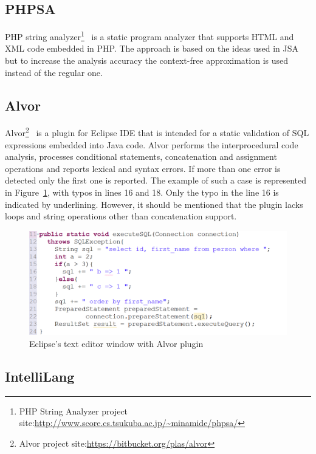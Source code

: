 \subsection{PHPSA}
PHP string analyzer\footnote{PHP String Analyzer project site:\url{http://www.score.cs.tsukuba.ac.jp/~minamide/phpsa/}}~\cite{PHPSA:ref} is a static program analyzer that supports HTML and XML code embedded in PHP. The approach is based on the ideas used in JSA but to increase the analysis accuracy the context-free approximation is used instead of the regular one.

\subsection{Alvor}

Alvor\footnote{Alvor project site:\url{https://bitbucket.org/plas/alvor}}~\cite{Alvor:ref} is a plugin for Eclipse IDE that is intended for a static validation of SQL expressions embedded into Java code. Alvor performs the interprocedural code analysis, processes conditional statements, concatenation and assignment operations and reports lexical and syntax errors. If more than one error is detected only the first one is reported. The example of such a case is represented in Figure~\ref{alvor_pic}, with typos in lines 16 and 18. Only the typo in the line 16 is indicated by underlining. However, it should be mentioned that the plugin lacks loops and string operations other than concatenation support.

\begin{figure}[h!]
    \begin{center}
        \includegraphics[scale=0.30]{Figures/Alvor.png}
    \end{center}
    \caption{Eclipse's text editor window with Alvor plugin}
    \label{alvor_pic}
\end{figure}

\subsection{IntelliLang}

